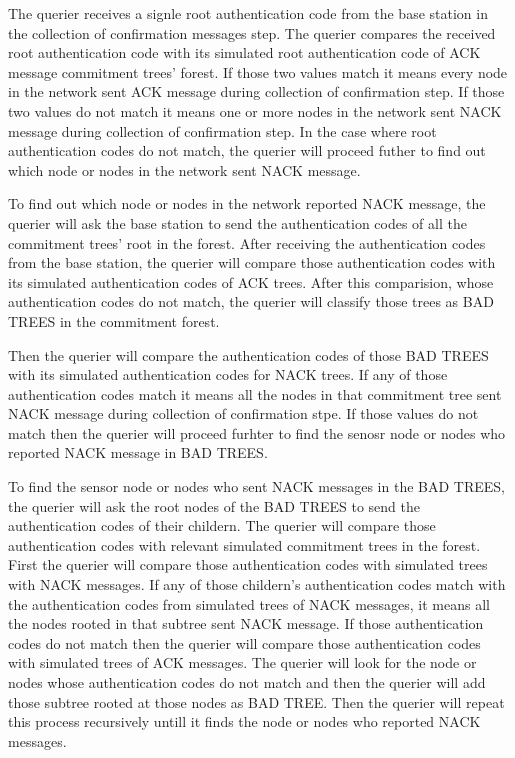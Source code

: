 The querier receives a signle root authentication code from the base station in the collection of confirmation messages step. The querier compares the received root authentication code with its simulated root authentication code of ACK message commitment trees' forest. If those two values match it means every node in the network sent ACK message during collection of confirmation step. If those two values do not match it means one or more nodes in the network sent NACK message during collection of confirmation step. In the case where root authentication codes do not match, the querier will proceed futher to find out which node or nodes in the network sent NACK message.

To find out which node or nodes in the network reported NACK message, the querier will ask the base station to send the authentication codes of all the commitment trees' root in the forest. After receiving the authentication codes from the base station, the querier will compare those authentication codes with its simulated authentication codes of ACK trees. After this comparision, whose authentication codes do not match, the querier will classify those trees as BAD TREES in the commitment forest. 

Then the querier will compare the authentication codes of those BAD TREES with its simulated authentication codes for NACK trees. If any of those authentication codes match it means all the nodes in that commitment tree sent NACK message during collection of confirmation stpe. If those values do not match then the querier will proceed furhter to find the senosr node or nodes who reported NACK message in BAD TREES.

To find the sensor node or nodes who sent NACK messages in the BAD TREES, the querier will ask the root nodes of the BAD TREES to send the authentication codes of their childern. The querier will compare those authentication codes with relevant simulated commitment trees in the forest. First the querier will compare those authentication codes with simulated trees with NACK messages. If any of those childern's authentication codes match with the authentication codes from simulated trees of NACK messages, it means all the nodes rooted in that subtree sent NACK message. If those authentication codes do not match then the querier will compare those authentication codes with simulated trees of ACK messages. The querier will look for the node or nodes whose authentication codes do not match and then the querier will add those subtree rooted at those nodes as BAD TREE. Then the querier will repeat this process recursively untill it finds the node or nodes who reported NACK messages.


